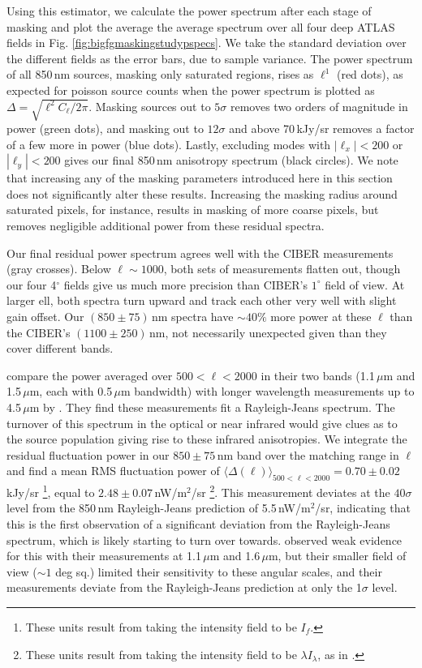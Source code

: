 \documentclass{emulateapj}
\begin{document}
Using this estimator, we calculate the power spectrum after each stage of masking and plot the average the average spectrum over all four deep ATLAS fields in Fig. \ref{fig:bigfgmaskingstudypspecs}. We take the standard deviation over the different fields as the error bars, due to sample variance. The power spectrum of all 850\,nm sources, masking only saturated regions, rises as $\ell^1$ (red dots), as expected for poisson source counts when the power spectrum is plotted as $\Delta=\sqrt{\ell^2C_\ell/2\pi}$. Masking sources out to $5\sigma$ removes two orders of magnitude in power (green dots), and masking out to $12\sigma$ and above 70\,kJy/sr removes a factor of a few more in power (blue dots). Lastly, excluding modes with $|\ell_x|<200$ or $|\ell_y|<200$ gives our final 850\,nm anisotropy spectrum (black circles). We note that increasing any of the masking parameters introduced here in this section does not significantly alter these results. Increasing the masking radius around saturated pixels, for instance, results in masking of more coarse pixels, but removes negligible additional power from these residual spectra. 

Our final residual power spectrum agrees well with the CIBER measurements (gray crosses). Below $\ell\sim1000$, both sets of measurements flatten out, though our  four 4$^\circ$ fields give us much more precision than CIBER's $1^\circ$ field of view. At larger ell, both spectra turn upward  and track each other very well with slight gain offset. Our $(850\pm75)$\,nm spectra have $\sim40\%$ more power at these $\ell$ than the CIBER's $(1100\pm250)$\,nm, not necessarily unexpected given than they cover different bands.

\citet{zemcov14} compare the power averaged over $500<\ell<2000$ in their two bands (1.1\,$\mu$m and 1.5\,$\mu$m, each with 0.5\,$\mu$m bandwidth) with longer wavelength measurements up to 4.5\,$\mu$m by \citet{cooray12,kash3,matsumoto11}. They find these measurements fit a Rayleigh-Jeans spectrum. The turnover of this spectrum in the optical or near infrared would give clues as to the source population giving rise to these infrared anisotropies. We integrate the residual fluctuation power in our $850\pm75$\,nm band over the matching range in $\ell$ and find a mean RMS fluctuation power of $\langle\Delta(\ell)\rangle_{500<\ell<2000}=0.70\pm0.02$\,kJy/sr \footnote{These units result from taking the intensity field to be $I_f$.}, equal to $2.48\pm0.07$\,nW/m$^2$/sr \footnote{These units result from taking the intensity field to be $\lambda I_\lambda$, as in \citet{zemcov14}.}. This measurement deviates at the $40\sigma$ level from the 850\,nm Rayleigh-Jeans prediction of 5.5\,nW/m$^2$/sr, indicating that this is the first observation of a significant deviation from the Rayleigh-Jeans spectrum, which is likely starting to turn over towards. \citet{zemcov14} observed weak evidence for this with their measurements at 1.1\,$\mu$m and 1.6\,$\mu$m, but their smaller field of view ($\sim1$ deg sq.) limited their sensitivity to these angular scales, and their measurements deviate from the Rayleigh-Jeans prediction at only the 1$\sigma$ level. 
\end{document}
